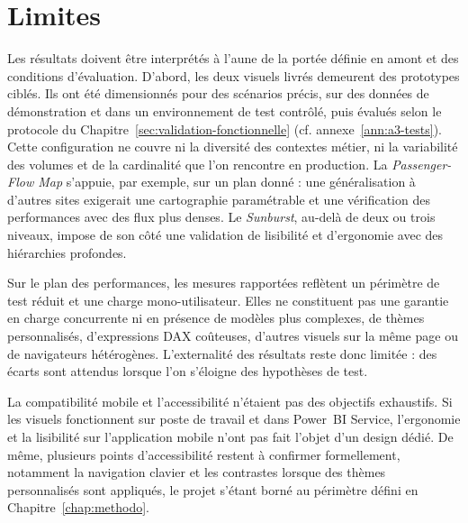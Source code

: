 
\section{Limites}
\label{sec:chap8-limites}

Les résultats doivent être interprétés à l’aune de la portée définie en amont et des conditions d’évaluation. 
D’abord, les deux visuels livrés demeurent des prototypes ciblés. 
Ils ont été dimensionnés pour des scénarios précis, sur des données de démonstration et dans un environnement de test contrôlé, 
puis évalués selon le protocole du Chapitre~\ref{sec:validation-fonctionnelle} (cf. annexe~\ref{ann:a3-tests}). 
Cette configuration ne couvre ni la diversité des contextes métier, ni la variabilité des volumes et de la cardinalité que l’on rencontre en production. 
La \textit{Passenger-Flow Map} s’appuie, par exemple, sur un plan donné : 
une généralisation à d’autres sites exigerait une cartographie paramétrable et une vérification des performances avec des flux plus denses. 
Le \textit{Sunburst}, au-delà de deux ou trois niveaux, impose de son côté une validation de lisibilité et d’ergonomie avec des hiérarchies profondes.

Sur le plan des performances, les mesures rapportées reflètent un périmètre de test réduit et une charge mono-utilisateur. 
Elles ne constituent pas une garantie en charge concurrente ni en présence de modèles plus complexes, de thèmes personnalisés, d’expressions DAX coûteuses, 
d’autres visuels sur la même page ou de navigateurs hétérogènes. 
L’externalité des résultats reste donc limitée : des écarts sont attendus lorsque l’on s’éloigne des hypothèses de test.

La compatibilité mobile et l’accessibilité n’étaient pas des objectifs exhaustifs. 
Si les visuels fonctionnent sur poste de travail et dans Power~BI Service, 
l’ergonomie et la lisibilité sur l’application mobile n’ont pas fait l’objet d’un design dédié. 
De même, plusieurs points d’accessibilité restent à confirmer formellement, notamment la navigation clavier et les contrastes lorsque des thèmes personnalisés sont appliqués, 
le projet s’étant borné au périmètre défini en Chapitre~\ref{chap:methodo}.

